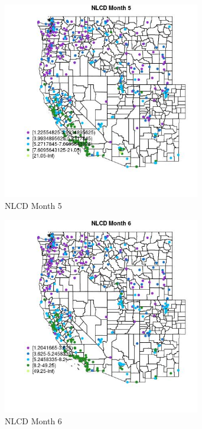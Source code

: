 \begin{figure} 
\centering  
\includegraphics[width=0.77\textwidth]{Code_Outputs/ML_input_report_ML_input_PM25_Step5_part_d_de_duplicated_aves_ML_input_MapObsMo5NLCD.jpg} 
\caption{\label{fig:ML_input_report_ML_input_PM25_Step5_part_d_de_duplicated_aves_ML_inputMapObsMo5NLCD}NLCD Month 5} 
\end{figure} 
 

\begin{figure} 
\centering  
\includegraphics[width=0.77\textwidth]{Code_Outputs/ML_input_report_ML_input_PM25_Step5_part_d_de_duplicated_aves_ML_input_MapObsMo6NLCD.jpg} 
\caption{\label{fig:ML_input_report_ML_input_PM25_Step5_part_d_de_duplicated_aves_ML_inputMapObsMo6NLCD}NLCD Month 6} 
\end{figure} 
 


